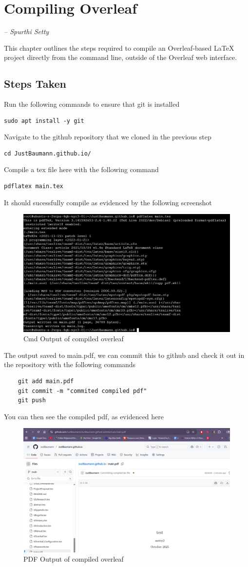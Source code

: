 \chapter{Compiling Overleaf}
\small{\textit{-- Spurthi Setty}}
\label{Chapter:CompilingOverleaf}

This chapter outlines the steps required to compile an Overleaf-based LaTeX project directly from the command line, outside of the Overleaf web interface. 

\section{Steps Taken}

Run the following commands to ensure that git is installed

\begin{verbatim}
sudo apt install -y git
\end{verbatim}

Navigate to the github repository that we cloned in the previous step 

\begin{verbatim}
cd JustBaumann.github.io/
\end{verbatim}

Compile a tex file here with the following command
\begin{verbatim}
pdflatex main.tex
\end{verbatim}

It should sucessfully compile as evidenced by the following screenshot 
\begin{figure}
    \centering
    \includegraphics[width=0.5\linewidth]{png/cmdoverleaf.png}
    \caption{Cmd Output of compiled overleaf}
    \label{fig:placeholder}
\end{figure}

The output saved to main.pdf, we can commit this to github and check it out in the repository with the following commands 

\begin{verbatim}
    git add main.pdf 
    git commit -m "commited compiled pdf"
    git push   
\end{verbatim}

You can then see the compiled pdf, as evidenced here
\begin{figure}
    \centering
    \includegraphics[width=0.5\linewidth]{png/overleafpdf.png}
    \caption{PDF Output of compiled overleaf}
    \label{fig:placeholder}
\end{figure}
